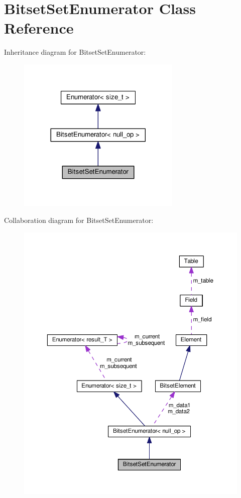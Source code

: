 \hypertarget{classBitsetSetEnumerator}{}\section{Bitset\+Set\+Enumerator Class Reference}
\label{classBitsetSetEnumerator}


Inheritance diagram for Bitset\+Set\+Enumerator\+:
\nopagebreak
\begin{figure}[H]
\begin{center}
\leavevmode
\includegraphics[width=221pt]{classBitsetSetEnumerator__inherit__graph}
\end{center}
\end{figure}


Collaboration diagram for Bitset\+Set\+Enumerator\+:
\nopagebreak
\begin{figure}[H]
\begin{center}
\leavevmode
\includegraphics[width=350pt]{classBitsetSetEnumerator__coll__graph}
\end{center}
\end{figure}
